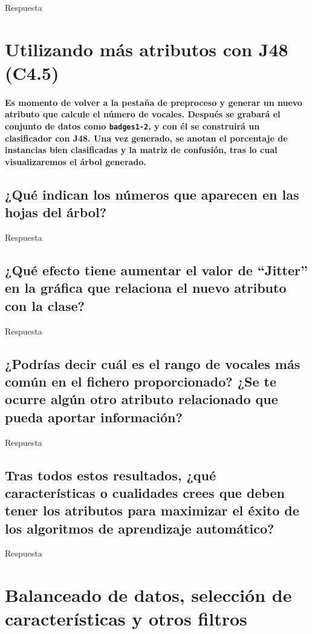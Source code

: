 \documentclass[12pt]{article}
\begin{document}
Respuesta

\newpage

\section{Utilizando más atributos con J48 (C4.5)}

\paragraph{\small Es momento de volver a la pestaña de preproceso y generar un
nuevo atributo que calcule el número de vocales. Después se grabará el conjunto
de datos como \texttt{badges1-2}, y con él se construirá un clasificador
con J48. Una vez generado, se anotan el porcentaje de instancias bien
clasificadas y la matriz de confusión, tras lo cual visualizaremos el árbol
generado.}

\subsection*{\small ¿Qué indican los números que aparecen en las hojas del
árbol?}

Respuesta

\subsection*{\small ¿Qué efecto tiene aumentar el valor de ``Jitter'' en la
gráfica que relaciona el nuevo atributo con la clase?}

Respuesta

\subsection*{\small ¿Podrías decir cuál es el rango de vocales más común en el
fichero proporcionado? ¿Se te ocurre algún otro atributo relacionado que pueda
aportar información?}

Respuesta

\subsection*{\small Tras todos estos resultados, ¿qué características o
cualidades crees que deben tener los atributos para maximizar el éxito de los
algoritmos de aprendizaje automático?}

Respuesta

\newpage

\section{Balanceado de datos, selección de características y otros filtros}
\end{document}
